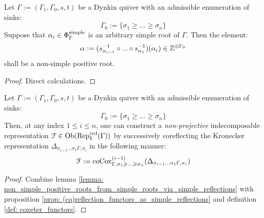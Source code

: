             \begin{lemma} \label{lemma: non_simple_positive_roots_from_simple_roots_via_simple_reflections}
                Let $\Gamma := (\Gamma_1, \Gamma_0, s, t)$ be a Dynkin quiver with an admissible enumeration of sinks:
                    $$\Gamma_0 := \{\sigma_1 \geq ... \geq \sigma_n\}$$
                Suppose that $\alpha_i \in \Phi_{\Gamma}^{\mathrm{simple}}$ is an arbitrary simple root of $\Gamma$. Then the element:
                    $$\alpha := (s_{\alpha_{i - 1}}^{-1} \circ ... \circ s_{\alpha_1}^{-1})(\alpha_i) \in \mathbb{Z}^{\oplus \Gamma_0}$$
                shall be a non-simple positive root. 
            \end{lemma}    
                \begin{proof}
                    Direct calculations.
                \end{proof}
            \begin{corollary} \label{coro: non_irreducible_indecomposable_representations_from_irreducible_representations_through_corelfections}
                Let $\Gamma := (\Gamma_1, \Gamma_0, s, t)$ be a Dynkin quiver with an admissible enumeration of sinks:
                    $$\Gamma_0 := \{\sigma_1 \geq ... \geq \sigma_n\}$$
                Then, at any index $1 \leq i \leq n$, one can construct a \textit{non-projective} indecomposable representation $\mathcal{F} \in \mathrm{Ob}(\mathrm{Rep}_k^{\mathrm{red}}(\Gamma))$ by successively coreflecting the Kronecker representation $\Delta_{\sigma_{i - 1} ... \sigma_1 \Gamma, \sigma_i}$ in the following manner:
                    $$\mathcal{F} := \mathrm{co}\mathrm{Cox}^{(i - 1)}_{\Gamma, \sigma_1 \geqslant ... \geqslant \sigma_n}(\Delta_{\sigma_{i - 1} ... \sigma_1 \Gamma, \sigma_i})$$
            \end{corollary}
                \begin{proof}
                    Combine lemma \ref{lemma: non_simple_positive_roots_from_simple_roots_via_simple_reflections} with proposition \ref{prop: (co)reflection_functors_as_simple_reflections} and definition \ref{def: coxeter_functors}.
                \end{proof}
